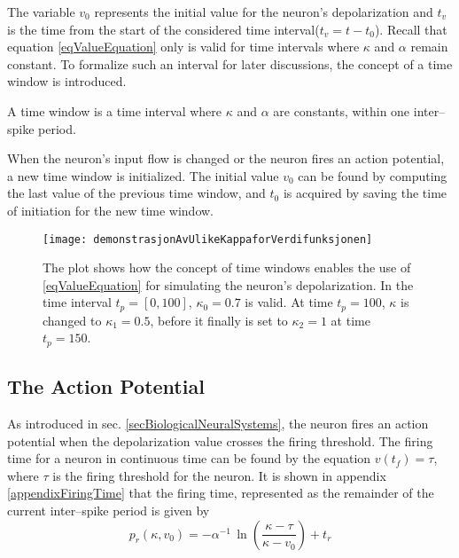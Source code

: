 	
		The variable $v_0$ represents the initial value for the neuron's depolarization and $t_v$ is the time from the start of the considered time interval\mbox{($t_v = t - t_0$)}.
		Recall that equation \ref{eqValueEquation} only is valid for time intervals where $\kappa$ and $\alpha$ remain constant.
		To formalize such an interval for later discussions, the concept of a time window is introduced. %
		\begin{mydef}
			A time window is a time interval where $\kappa$ and $\alpha$ are constants, within one inter--spike period.
			\label{defTimeWindow}
		\end{mydef}
		When the neuron's input flow is changed or the neuron fires an action potential, a new time window is initialized.
		The initial value $v_0$ can be found by computing the last value of the previous time window, and $t_0$ is acquired by saving the time of initiation for the new time window.


\begin{figure}[htb!p]
    \centering
    \texttt{[image: demonstrasjonAvUlikeKappaforVerdifunksjonen]}
 	  \caption{
			The plot shows how the concept of time windows enables the use of \eqref{eqValueEquation} for simulating the neuron's depolarization.
			In the time interval $t_p = [0, 100]$, $\kappa_0 = 0.7$ is valid.
			At time $t_p = 100$, $\kappa$ is changed to $\kappa_1 = 0.5$, before it finally is set to $\kappa_2 = 1$ at time $t_p = 150$.
			}
\end{figure}

	\subsection{The Action Potential}
	\label{ssecTheActionPotential}
	As introduced in sec. \ref{secBiologicalNeuralSystems}, the neuron fires an action potential when the depolarization value crosses the firing threshold.
	The firing time for a neuron in continuous time can be found by the equation $v(t_f) = \tau$, where $\tau$ is the firing threshold for the neuron.
	It is shown in appendix \ref{appendixFiringTime} that the firing time, represented as the remainder of the current inter--spike period is given by
\begin{equation}
	p_r(\kappa, v_0)  	= -\alpha^{-1} \, \ln \left( \frac{\kappa - \tau}{\kappa - v_0} \right) + t_r
	\label{eqEstimatedTimeToFiring}
\end{equation}

